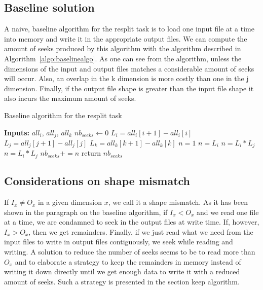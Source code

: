 \documentclass[conference]{IEEEtran}
\begin{document}
\subsection{Baseline solution}
A naive, baseline algorithm for the resplit task is to load one input file at a
time into memory and write it in the appropriate output files. We can compute
the amount of seeks produced by this algorithm with the algorithm described in
Algorithm~\ref{algo:baselinealgo}. As one can see from the algorithm, unless the dimensions
of the input and output files matches a considerable amount of seeks will occur.
Also, an overlap in the k dimension is more costly than one in the j dimension.
Finally, if the output file shape is greater than the input file shape it also
incurs the maximum amount of seeks.

\begin{algorithm}
  \caption{Baseline algorithm for the resplit task}
  \label{algo:baselinealgo}
  \begin{algorithmic}
    \STATE \textbf{Inputs:} $all_i$, $all_j$, $all_k$
    \STATE $nb_{seeks} \leftarrow 0$
          \STATE $L_i = all_i[i+1] - all_i[i]$
          \STATE $L_j = all_j[j+1] - all_j[j]$
          \STATE $L_k = all_k[k+1] - all_k[k]$
                \STATE $n = 1$
              \ELSE
                \STATE $n = L_i$
              \ENDIF
            \ELSE
              \STATE $n = L_i*L_j$
            \ENDIF
          \ELSE
            \STATE $n = L_i*L_j$
          \ENDIF
          \STATE $nb_{seeks} += n$
        \ENDFOR
      \ENDFOR
    \ENDFOR
    \STATE return $nb_{seeks}$
  \end{algorithmic}
\end{algorithm}

\subsection{Considerations on shape mismatch}
If $I_x \neq O_x$ in a given dimension $x$, we call it a shape mismatch. As it has been
shown in the paragraph on the baseline algorithm, if $I_x < O_x$ and we read one
file at a time, we are condamned to seek in the output files at write time. If,
however, $I_x > O_x$, then we get remainders. Finally, if we just read what we need
from the input files to write in output files contiguously, we seek while reading
and writing. A solution to reduce the number of seeks seems to be to read more
than $O_x$ and to elaborate a strategy to keep the remainders in memory instead of
writing it down directly until we get enough data to write it with a reduced
amount of seeks. Such a strategy is presented in the section keep algorithm.
\end{document}
